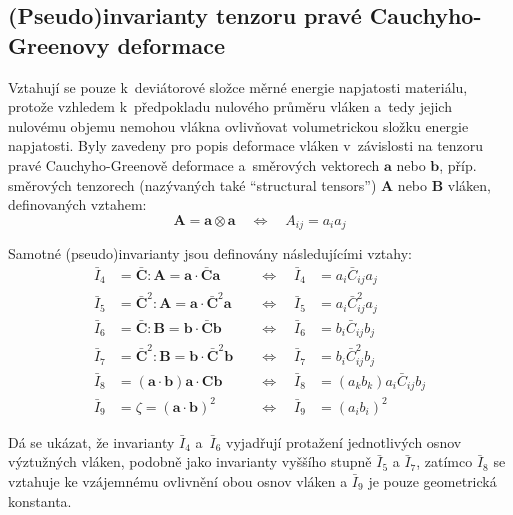 
\subsection{(Pseudo)invarianty tenzoru pravé Cauchyho-Greenovy deformace}
Vztahují se pouze k~deviátorové složce měrné energie napjatosti materiálu, protože vzhledem k~předpokladu nulového průměru vláken a~tedy jejich nulovému objemu nemohou vlákna ovlivňovat volumetrickou složku energie napjatosti.
Byly zavedeny pro popis deformace vláken v~závislosti na tenzoru pravé Cauchyho-Greenově deformace a~směrových vektorech $\bm{a}$ nebo $\bm{b}$, příp. směrových tenzorech (nazývaných  také \enquote{structural tensors}) $\bm{A}$ nebo $\bm{B}$ vláken, definovaných vztahem:
\begin{equation*}
\bm{A} = \bm{a} \otimes \bm{a}
\quad\Leftrightarrow\quad
A_{ij} = a_i a_j
\end{equation*}

Samotné (pseudo)invarianty jsou definovány následujícími vztahy:
\begin{align*}
\bar{I}_4 &= \bar{\bm{C}} : \bm{A} = \bm{a} \cdot \bar{\bm{C}} \bm{a} \quad&\Leftrightarrow\quad \bar{I}_4 &= a_i \bar{C}_{ij} a_j\\
\bar{I}_5 &= \bar{\bm{C}}^2 : \bm{A} = \bm{a} \cdot \bar{\bm{C}}^2 \bm{a} \quad&\Leftrightarrow\quad \bar{I}_5 &= a_i \bar{C}_{ij}^2 a_j\\
\bar{I}_6 &= \bar{\bm{C}} : \bm{B} = \bm{b} \cdot \bar{\bm{C}} \bm{b} \quad&\Leftrightarrow\quad \bar{I}_6 &= b_i \bar{C}_{ij} b_j\\
\bar{I}_7 &= \bar{\bm{C}}^2 : \bm{B} = \bm{b} \cdot \bar{\bm{C}}^2 \bm{b} \quad&\Leftrightarrow\quad \bar{I}_7 &= b_i \bar{C}_{ij}^2 b_j\\
\bar{I}_8 &= (\bm{a} \cdot \bm{b}) \bm{a} \cdot \bm{C} \bm{b} \quad&\Leftrightarrow\quad \bar{I}_8 &= (a_k b_k) a_i \bar{C}_{ij} b_j\\
\bar{I}_9 &= \zeta = (\bm{a} \cdot \bm{b})^2 \quad&\Leftrightarrow\quad \bar{I}_9 &= (a_i b_i)^2
\end{align*}

Dá se ukázat, že invarianty $\bar{I}_4$ a~$\bar{I}_6$ vyjadřují protažení jednotlivých osnov výztužných vláken, podobně jako invarianty vyššího stupně $\bar{I}_5$ a $\bar{I}_7$, zatímco $\bar{I}_8$ se vztahuje ke vzájemnému ovlivnění obou osnov vláken a $\bar{I}_9$ je pouze geometrická konstanta.
